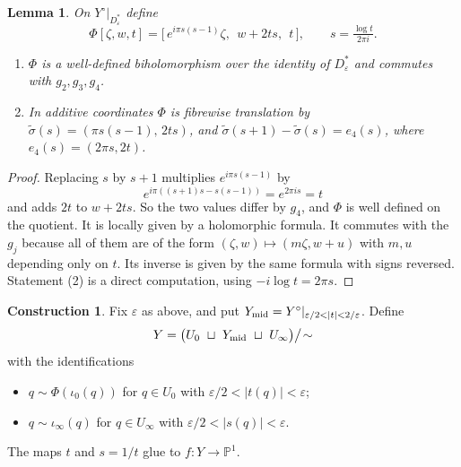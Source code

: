 \documentclass{article}
\newtheorem{lemma}[theorem]{Lemma}
\theoremstyle{definition}
\newtheorem{construction}[theorem]{Construction}
\theoremstyle{plain}
\newcommand{\PP}{\mathbb{P}}
\newcommand{\Yo}{Y^{\circ}}
\begin{document}
\begin{lemma}\label{lem:Phi}
On $\Yo|_{D^*_\varepsilon}$ define
\[
\Phi[\zeta,w,t]=\big[\,e^{i\pi s(s-1)}\zeta,\ \ w+2ts,\ \ t\,\big],\qquad s=\tfrac{\log t}{2\pi i}.
\]
\begin{enumerate}
\item $\Phi$ is a well-defined biholomorphism over the identity of $D^*_\varepsilon$ and
  commutes with $g_2,g_3,g_4$.
\item In additive coordinates $\Phi$ is fibrewise translation by
  $\tilde\sigma(s)=(\pi s(s-1),\,2ts)$, and $\tilde\sigma(s+1)-\tilde\sigma(s)=e_4(s)$,
  where $e_4(s)=(2\pi s,2t)$.
\end{enumerate}
\end{lemma}
\begin{proof}
Replacing $s$ by $s+1$ multiplies $e^{i\pi s(s-1)}$ by
\[e^{i\pi((s+1)s-s(s-1))}=e^{2\pi is}=t\]
and adds $2t$ to $w+2ts$. So the two values differ by $g_4$, and $\Phi$ is well
defined on the quotient. It is locally given by a holomorphic formula. It commutes
with the $g_j$ because all of them are of the form $(\zeta,w)\mapsto(m\zeta,w+u)$ with
$m,u$ depending only on $t$. Its inverse is given by the same formula with signs
reversed. Statement (2) is a direct computation, using $-i\log t=2\pi s$.
\end{proof}

\begin{construction}\label{con:Y}
Fix $\varepsilon$ as above, and put $Y_{\rm mid}=\Yo|_{\varepsilon/2<|t|<2/\varepsilon}$. Define
\[
Y=\big(U_0\ \sqcup\ Y_{\rm mid}\ \sqcup\ U_\infty\big)\big/\!\sim
\]
with the identifications
\begin{itemize}
\item $q\sim\Phi(\iota_0(q))$ for $q\in U_0$ with $\varepsilon/2<|t(q)|<\varepsilon$;
\item $q\sim\iota_\infty(q)$ for $q\in U_\infty$ with $\varepsilon/2<|s(q)|<\varepsilon$.
\end{itemize}
The maps $t$ and $s=1/t$ glue to $f\colon Y\to\PP^1$.
\end{construction}
\end{document}
